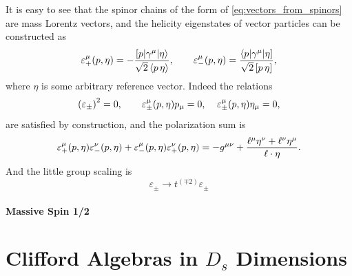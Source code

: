 It is easy to see that the spinor chains of the form of \cref{eq:vectors_from_spinors} are mass Lorentz vectors, and
the helicity eigenstates of vector particles can be constructed as
\begin{equation}
  \varepsilon_+^\mu(p,\eta) = -\frac{\sbraket(p,\gamma^\mu,\eta)}{\sqrt{2} \spaa(p,\eta)}, \qquad \varepsilon_-^\mu(p,\eta) = \frac{\brasket(p,\gamma^\mu,\eta)}{\sqrt{2} \spbb(p,\eta)},
\end{equation}
where $\eta$ is some arbitrary reference vector. Indeed
the relations 
\begin{equation}
  \qty(\varepsilon_{\pm})^2 =0, \qquad
  \varepsilon^{\mu}_{\pm}(p,\eta) p_\mu = 0,
  \;\;\;\;
  \varepsilon^{\mu}_{\pm}(p,\eta) \eta_\mu = 0,
\end{equation}
are satisfied by construction, and the polarization sum is
\begin{equation}
  \varepsilon^{\mu}_{+}(p,\eta)\varepsilon^{\nu}_{-}(p,\eta) + \varepsilon^{\mu}_{-}(p,\eta)\varepsilon^{\nu}_{+}(p,\eta) = -g^{\mu\nu} + \frac{\ell^\mu \eta^\nu + \ell^\nu \eta^\mu}{\sp(\ell,\eta)}.
\end{equation}
And the little group scaling is
\begin{equation}
  \varepsilon_{\pm} \longrightarrow t^{(\mp 2)} \varepsilon_{\pm}
\end{equation}


\subsubsection{Massive Spin 1/2}






\chapter{Clifford Algebras in $D_s$ Dimensions}
\label{sec:clifford_algebra_ds}


